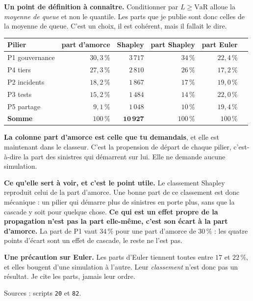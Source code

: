 \documentclass[11pt,a4paper]{article}
\begin{document}
\textbf{Un point de définition à connaître.} Conditionner par $L \geq \mathrm{VaR}$ alloue la
\emph{moyenne de queue} et non le quantile. Les parts que je publie sont donc celles de la moyenne
de queue. C'est un choix, il est cohérent, mais il fallait le dire.

\begin{center}
\begin{tabular}{@{}l r r r r r@{}}
\toprule
\textbf{Pilier} & \textbf{part d'amorce} & \textbf{Shapley} & \textbf{part Shapley} & \textbf{part Euler} \\
\midrule
P1 gouvernance & $30{,}3\,\%$ & $3\,717$ & $34\,\%$ & $22{,}4\,\%$ \\
P4 tiers       & $27{,}3\,\%$ & $2\,810$ & $26\,\%$ & $17{,}2\,\%$ \\
P2 incidents   & $18{,}2\,\%$ & $1\,867$ & $17\,\%$ & $19{,}0\,\%$ \\
P3 tests       & $15{,}2\,\%$ & $1\,484$ & $14\,\%$ & $22{,}0\,\%$ \\
P5 partage     & $9{,}1\,\%$  & $1\,048$ & $10\,\%$ & $19{,}4\,\%$ \\
\midrule
\textbf{Somme} & $100\,\%$ & $\mathbf{10\,927}$ & $100\,\%$ & $100\,\%$ \\
\bottomrule
\end{tabular}
\end{center}

\textbf{La colonne \og part d'amorce \fg{} est celle que tu demandais}, et elle est maintenant dans le
classeur. C'est la propension de départ de chaque pilier, c'est-à-dire la part des sinistres qui
démarrent sur lui. Elle ne demande aucune simulation.

\textbf{Ce qu'elle sert à voir, et c'est le point utile.} Le classement Shapley reproduit celui de
la part d'amorce. Une bonne part de ce classement est donc mécanique : un pilier qui démarre plus
de sinistres en porte plus, sans que la cascade y soit pour quelque chose. \textbf{Ce qui est un
effet propre de la propagation n'est pas la part elle-même, c'est son écart à la part d'amorce.}
La part de P1 vaut $34\,\%$ pour une part d'amorce de $30\,\%$ : les quatre points d'écart sont
un effet de cascade, le reste ne l'est pas.

\textbf{Une précaution sur Euler.} Les parts d'Euler tiennent toutes entre $17$ et $22\,\%$, et
elles bougent d'une simulation à l'autre. Leur \emph{classement} n'est donc pas un résultat. Je
cite les parts, jamais leur ordre.

\medskip
{\small Sources : scripts \texttt{20} et \texttt{82}.}
\end{document}
